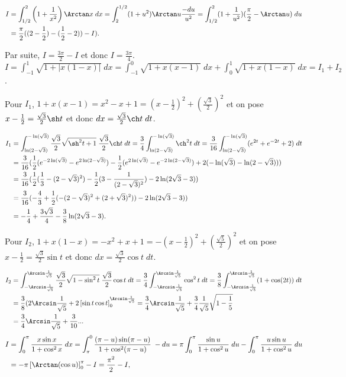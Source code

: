 {{\begin{align*}\ensuremath
I&=\int_{1/2}^{2}\left(1+\frac{1}{x^2}\right)\Arctan x\;dx=\int_{2}^{1/2}(1+u^2)\Arctan u\frac{-du}{u^2}=\int_{1/2}^{2}(1+\frac{1}{u^2})(\frac{\pi}{2}-\Arctan u)\;du\\
 &=\frac{\pi}{2}((2-\frac{1}{2})-(\frac{1}{2}-2))-I).
\end{align*}

Par suite, $I=\frac{3\pi}{2}-I$ et donc $I=\frac{3\pi}{4}$.
$I=\int_{-1}^{1}\sqrt{1+|x(1-x)|}\;dx=\int_{-1}^{0}\sqrt{1+x(x-1)}\;dx+\int_{0}^{1}\sqrt{1+x(1-x)}\;dx=I_1+I_2$.

Pour $I_1$, $1+x(x-1)=x^2-x+1=(x-\frac{1}{2})^2+(\frac{\sqrt{3}}{2})^2$ et on pose $x-\frac{1}{2}=\frac{\sqrt{3}}{2}\sh t$ et donc $dx=\frac{\sqrt{3}}{2}\ch t\;dt$.

\begin{align*}\ensuremath
I_1&=\int_{\ln(2-\sqrt{3})}^{-\ln(\sqrt{3})}\frac{\sqrt{3}}{2}\sqrt{\sh^2t+1}\;\frac{\sqrt{3}}{2}\ch t\;dt=
\frac{3}{4}\int_{\ln(2-\sqrt{3})}^{-\ln(\sqrt{3})}\ch^2t\;dt=\frac{3}{16}\int_{\ln(2-\sqrt{3})}^{-\ln(\sqrt{3})}(e^{2t}+e^{-2t}+2)\;dt\\
 &=\frac{3}{16}(\frac{1}{2}(e^{-2\ln(\sqrt{3})}-e^{2\ln(2-\sqrt{3})})-\frac{1}{2}(e^{2\ln(\sqrt{3})}-e^{-2\ln(2-\sqrt{3})})+2(-\ln(\sqrt{3})-\ln(2-\sqrt{3})))\\
 &=\frac{3}{16}(\frac{1}{2}(\frac{1}{3}-(2-\sqrt{3})^2)-\frac{1}{2}(3-\frac{1}{(2-\sqrt{3})^2})-2\ln(2\sqrt{3}-3))\\
 &=\frac{3}{16}(-\frac{4}{3}+\frac{1}{2}(-(2-\sqrt{3})^2+(2+\sqrt{3})^2))-2\ln(2\sqrt{3}-3))\\
 &=-\frac{1}{4}+\frac{3\sqrt{3}}{4}-\frac{3}{8}\ln(2\sqrt{3}-3).
\end{align*}

Pour $I_2$, $1+x(1-x)=-x^2+x+1=-(x-\frac{1}{2})^2+(\frac{\sqrt{5}}{2})^2$ et on pose $x-\frac{1}{2}=\frac{\sqrt{3}}{2}\sin t$ et donc $dx=\frac{\sqrt{3}}{2}\cos t\;dt$.

\begin{align*}\ensuremath
I_2&=\int_{-\Arcsin\frac{1}{\sqrt{5}}}^{\Arcsin\frac{1}{\sqrt{5}}}\frac{\sqrt{3}}{2}\sqrt{1-\sin^2t}\;\frac{\sqrt{3}}{2}\cos t\;dt=
\frac{3}{4}\int_{-\Arcsin\frac{1}{\sqrt{5}}}^{\Arcsin\frac{1}{\sqrt{5}}}\cos^2t\;dt
=\frac{3}{8}\int_{-\Arcsin\frac{1}{\sqrt{5}}}^{\Arcsin\frac{1}{\sqrt{5}}}(1+\cos(2t))\;dt\\
 &=\frac{3}{8}(2\Arcsin\frac{1}{\sqrt{5}}+2\left[\sin t\cos t\right]_{0}^{\Arcsin\frac{1}{\sqrt{5}}}
 =\frac{3}{4}\Arcsin\frac{1}{\sqrt{5}}+\frac{3}{4}\frac{1}{\sqrt{5}}\sqrt{1-\frac{1}{5}}\\
 &=\frac{3}{4}\Arcsin\frac{1}{\sqrt{5}}+\frac{3}{10}...
\end{align*}
\begin{align*}\ensuremath
I&=\int_{0}^{\pi}\frac{x\sin x}{1+\cos^2x}\;dx=\int_{\pi}^{0}\frac{(\pi-u)\sin(\pi-u)}{1+\cos^2(\pi-u)}\;-du
=\pi\int_{0}^{\pi}\frac{\sin u}{1+\cos^2u}\;du-\int_{0}^{\pi}\frac{u\sin u}{1+\cos^2u}\;du\\
 &=-\pi\left[\Arctan(\cos u)\right]_{0}^{\pi}-I=\frac{\pi^2}{2}-I,
\end{align*}

}}
